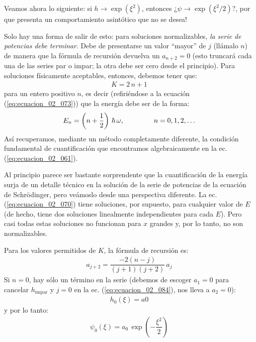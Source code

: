 Veamos ahora lo siguiente: si $h \to \exp \left( \xi^{2} \right)$, entonces ¿$\psi \to \exp \left( \xi^{2}/2 \right)$?, por que presenta un comportamiento asintótico que no se desea!
\par
Solo hay una forma de salir de esto: para soluciones normalizables, \textit{la serie de potencias debe terminar}. Debe de presentarse un valor \enquote{mayor} de $j$ (llámalo $n$) de manera que la fórmula de recursión devuelva un $a_{n+2} = 0$ (esto truncará cada una de las series par o impar; la otra debe ser cero desde el principio). Para soluciones físicamente aceptables, entonces, debemos tener que:
\begin{align*}
K = 2 \, n + 1
\end{align*}
para un entero positivo $n$, es decir (refiriéndose a la ecuación (\ref{eq:ecuacion_02_073})) que la energía debe ser de la forma:
\begin{align}
E_{n} = \left( n + \dfrac{1}{2} \right) \, \hbar \, \omega , \hspace{1.5cm} n = 0, 1, 2, \ldots
\label{eq:ecuacion_02_083}
\end{align}
Así recuperamos, mediante un método completamente diferente, la condición fundamental de cuantificación que encontramos algebraicamente en la ec. (\ref{eq:ecuacion_02_061}).
\par
Al principio parece ser bastante sorprendente que la cuantificación de la energía surja de un detalle técnico en la solución de la serie de potencias de la ecuación de Schrödinger, pero veámoslo desde una perspectiva diferente. La ec. (\ref{eq:ecuacion_02_070}) tiene soluciones, por supuesto, para cualquier valor de $E$ (de hecho, tiene dos soluciones linealmente independientes para cada $E$). Pero casi todas estas soluciones no funcionan para $x$ grandes y, por lo tanto, no son normalizables.
\par
Para los valores permitidos de $K$, la fórmula de recursión es:
\begin{align}
a_{j+2} = \dfrac{- 2 (n - j)}{(j + 1)(j + 2)} \, a_{j}
\label{eq:ecuacion_02_084}
\end{align}
Si $n = 0$, hay sólo un término en la serie (debemos de escoger $a_{1} = 0$ para cancelar $h_{\text{impar}}$ y $j = 0$ en la ec. (\ref{eq:ecuacion_02_084}), nos lleva a $a_{2} = 0$):
\begin{align*}
h_{0} (\xi) = a{0}
\end{align*}
y por lo tanto:
\begin{align*}
\psi_{0} (\xi) = a_{0} \, \exp \left( - \dfrac{\xi^{2}}{2} \right)
\end{align*}
